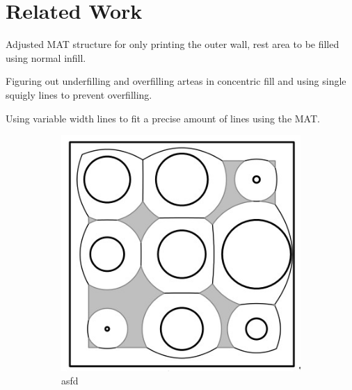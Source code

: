\section{Related Work}
Adjusted MAT structure for only printing the outer wall, rest area to be filled using normal infill. \cite{Moesen2011}

Figuring out underfilling and overfilling arteas in concentric fill and using single squigly lines to prevent overfilling. \cite{Jin2017}

Using variable width lines to fit a precise amount of lines using the MAT. \cite{Ding2016a}

\begin{figure}
\begin{subfigure}{0.45\columnwidth}
\includegraphics[width=\columnwidth]{sources/related_work/moessen.jpg}
\caption{asfd}
\label{moessen}
\end{subfigure}
\begin{subfigure}{0.45\columnwidth}

\end{subfigure}
\end{figure}
